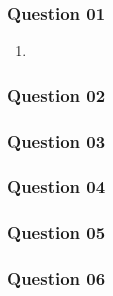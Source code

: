 \subsubsection*{Question 01}
\begin{enumerate}
    \item 
\end{enumerate}

\subsubsection*{Question 02}


\subsubsection*{Question 03}

\subsubsection*{Question 04}

\subsubsection*{Question 05}

\subsubsection*{Question 06}